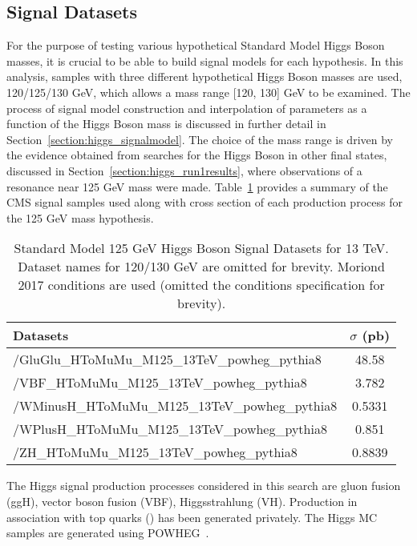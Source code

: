 \subsection{Signal Datasets}
For the purpose of testing various hypothetical Standard Model Higgs Boson masses, it is crucial to be able to build signal models for each hypothesis. In this analysis, samples with three different hypothetical Higgs Boson masses are used, 120/125/130 GeV, which allows a mass range [120, 130] GeV to be examined. The process of signal model construction and interpolation of parameters as a function of the Higgs Boson mass is discussed in further detail in Section~\ref{section:higgs_signalmodel}. The choice of the mass range is driven by the evidence obtained from searches for the Higgs Boson in other final states, discussed in Section~\ref{section:higgs_run1results}, where observations of a resonance near 125 GeV mass were made. Table~\ref{table:higgs_data_signaldatasets} provides a summary of the CMS signal samples used along with cross section of each production process for the 125 GeV mass hypothesis.
\begin{table}[htb]
    \caption{Standard Model 125 GeV Higgs Boson Signal Datasets for 13 TeV. Dataset names for 120/130 GeV are omitted for brevity. Moriond 2017 conditions are used (omitted the conditions specification for brevity).}
    \label{table:higgs_data_signaldatasets}
        \begin{center}
        \begin{tabular}{ l  c}
            \hline
            Datasets & $\sigma$ (pb)\\
            \hline
            {/GluGlu\_HToMuMu\_M125\_13TeV\_powheg\_pythia8} & 48.58\\
            {/VBF\_HToMuMu\_M125\_13TeV\_powheg\_pythia8} & 3.782\\
            {/WMinusH\_HToMuMu\_M125\_13TeV\_powheg\_pythia8} & 0.5331\\
            {/WPlusH\_HToMuMu\_M125\_13TeV\_powheg\_pythia8} & 0.851\\
            {/ZH\_HToMuMu\_M125\_13TeV\_powheg\_pythia8} & 0.8839 \\
            \hline
        \end{tabular}
        \end{center}
\end{table}
The Higgs signal production processes considered in this search are gluon
fusion (ggH), vector boson fusion (VBF), Higgsstrahlung (VH). Production in
association with top quarks (\ttH) has been generated privately. The Higgs MC samples are generated using {\sc POWHEG}~\cite{Nason:2004rx}.

